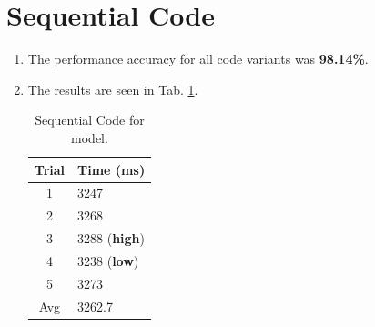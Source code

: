 \documentclass[a4paper,12pt]{article}
\theoremstyle{definition}
\theoremstyle{remark}
\begin{document}
		\section{Sequential Code}
		\begin{enumerate}
			\item The performance accuracy for all code variants was \textbf{98.14\%}.
			\item The results are seen in Tab. \ref{tab:Seq}.
			\begin{table}[h]
				\centering
				\begin{tabular}{|c|l|}
					\hline
					\textbf{Trial}& \textbf{Time (ms)}  \\
					\hline\hline
					1&  3247 \\
					2&   3268\\
					3&   3288 (\textbf{high})\\
					4&    3238 (\textbf{low})\\
					5&    3273\\
					\hline
					Avg&  3262.7\\
					\hline
				\end{tabular}
				\caption{Sequential Code for model.}
				\label{tab:Seq}
			\end{table}
		\end{enumerate}
\end{document}
